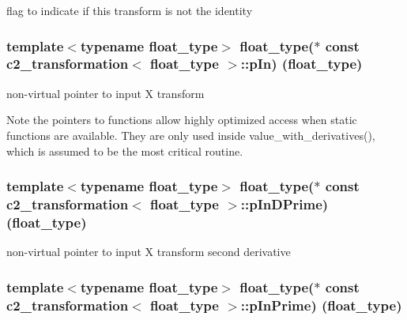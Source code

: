 flag to indicate if this transform is not the identity 

\subsubsection[{\texorpdfstring{p\+In}{pIn}}]{\setlength{\rightskip}{0pt plus 5cm}template$<$typename float\+\_\+type$>$ float\+\_\+type($\ast$ const {\bf c2\+\_\+transformation}$<$ float\+\_\+type $>$\+::p\+In) (float\+\_\+type)}\hypertarget{classc2__transformation_a4600cf8952fc112bb50f4f312738d022}{}\label{classc2__transformation_a4600cf8952fc112bb50f4f312738d022}


non-\/virtual pointer to input X transform 

\begin{DoxyNote}{Note}
the pointers to functions allow highly optimized access when static functions are available. They are only used inside value\+\_\+with\+\_\+derivatives(), which is assumed to be the most critical routine. 
\end{DoxyNote}
\subsubsection[{\texorpdfstring{p\+In\+D\+Prime}{pInDPrime}}]{\setlength{\rightskip}{0pt plus 5cm}template$<$typename float\+\_\+type$>$ float\+\_\+type($\ast$ const {\bf c2\+\_\+transformation}$<$ float\+\_\+type $>$\+::p\+In\+D\+Prime) (float\+\_\+type)}\hypertarget{classc2__transformation_a875d75e4e0299753f6ea34bd06594ede}{}\label{classc2__transformation_a875d75e4e0299753f6ea34bd06594ede}


non-\/virtual pointer to input X transform second derivative 

\subsubsection[{\texorpdfstring{p\+In\+Prime}{pInPrime}}]{\setlength{\rightskip}{0pt plus 5cm}template$<$typename float\+\_\+type$>$ float\+\_\+type($\ast$ const {\bf c2\+\_\+transformation}$<$ float\+\_\+type $>$\+::p\+In\+Prime) (float\+\_\+type)}\hypertarget{classc2__transformation_a4600103aeb9ea6aec1124ac0085bf268}{}\label{classc2__transformation_a4600103aeb9ea6aec1124ac0085bf268}


